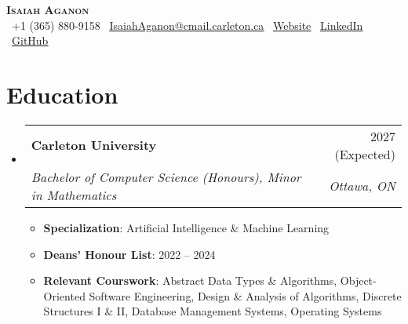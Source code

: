 \documentclass[letterpaper,11pt]{article}
\makeatletter
\newcommand{\resumeItem}[1]{
  \item\small{
    {#1 \vspace{-2pt}}
  }
}
\newcommand{\resumeSubheading}[4]{
  \vspace{-2pt}\item
    \begin{tabular*}{0.97\textwidth}[t]{l@{\extracolsep{\fill}}r}
      \textbf{#1} & #2 \\
      \textit{\small#3} & \textit{\small #4} \\
    \end{tabular*}\vspace{-7pt}
}
\newcommand{\resumeSubHeadingListStart}{\begin{itemize}[leftmargin=0.15in, label={}]}
\newcommand{\resumeSubHeadingListEnd}{\end{itemize}}
\newcommand{\resumeItemListStart}{\begin{itemize}}
\newcommand{\resumeItemListEnd}{\end{itemize}\vspace{-5pt}}
\makeatother
\begin{document}

\begin{center}
  \textbf{\Huge \scshape Isaiah Aganon} \\ \vspace{1pt}
  \small
  \faPhone\ +1 (365) 880-9158  
  \hspace{5pt}
  \faEnvelope\ \href{mailto:IsaiahAganon@cmail.carleton.ca?subject=Re:%20Internship%20Application%20Status&body=Hello%20Isaiah,}{\uline{IsaiahAganon@cmail.carleton.ca}} 
  \hspace{5pt}
  \faGlobe\ \href{https://webpage-aganonisaiahs-projects.vercel.app/}{\uline{Website}}
  \hspace{5pt}
  \faLinkedin\ \href{https://www.linkedin.com/in/isaiah-aganon-888b892a8/}{\uline{LinkedIn}}
  \hspace{5pt}
  \faGithub\ \href{https://github.com/AganonIsaiah}{\uline{GitHub}}
\end{center}


\section{Education}
\resumeSubHeadingListStart
    \resumeSubheading
      {Carleton University}{2027 (Expected)}
      {Bachelor of Computer Science (Honours), Minor in Mathematics}{Ottawa, ON}
      \resumeItemListStart
        \resumeItem{{\bf Specialization}: Artificial Intelligence \& Machine Learning}
        \resumeItem{{\bf Deans' Honour List}: 2022 -- 2024}
        \resumeItem{{\bf Relevant Courswork}: Abstract Data Types \& Algorithms, Object-Oriented Software Engineering, Design \& Analysis of Algorithms, Discrete Structures I \& II, Database Management Systems, Operating Systems}
      \resumeItemListEnd
\resumeSubHeadingListEnd
\end{document}
